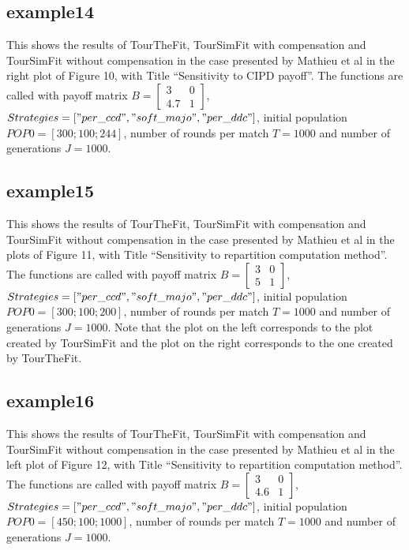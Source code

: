 \subsection{example14}
This shows the results of TourTheFit, TourSimFit with compensation and TourSimFit without compensation in the case presented by Mathieu et al in the right plot of Figure 10, with Title ``Sensitivity to CIPD payoff''. The functions are called with payoff matrix $B = \begin{bmatrix} 3 & 0 \\ 4.7 & 1 \end{bmatrix}$, $Strategies = ["per\_ccd", "soft\_majo", "per\_ddc"]$, initial population $POP0 = [300; 100; 244]$, number of rounds per match $T = 1000$ and number of generations $J = 1000$.

\subsection{example15}
This shows the results of TourTheFit, TourSimFit with compensation and TourSimFit without compensation in the case presented by Mathieu et al in the plots of Figure 11, with Title ``Sensitivity to repartition computation method''. The functions are called with payoff matrix $B = \begin{bmatrix} 3 & 0 \\ 5 & 1 \end{bmatrix}$, $Strategies = ["per\_ccd", \- "soft\_majo", "per\_ddc"]$, initial population $POP0 = [300; 100; 200]$, number of rounds per match $T = 1000$ and number of generations $J = 1000$. Note that the plot on the left corresponds to the plot created by TourSimFit and the plot on the right corresponds to the one created by TourTheFit.

\subsection{example16}
This shows the results of TourTheFit, TourSimFit with compensation and TourSimFit without compensation in the case presented by Mathieu et al in the left plot of Figure 12, with Title ``Sensitivity to repartition computation method''. The functions are called with payoff matrix $B = \begin{bmatrix} 3 & 0 \\ 4.6 & 1 \end{bmatrix}$, $Strategies = ["per\_ccd", "soft\_majo", "per\_ddc"]$, initial population $POP0 = [450; 100; 1000]$, number of rounds per match $T = 1000$ and number of generations $J = 1000$.


